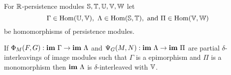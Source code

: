 \begin{theorem}\label{thm:interleaving_main}
  For $\mathbb{R}$-persistence modules $\mathbb{S}, \mathbb{T}, \mathbb{U}, \mathbb{V}, \mathbb{W}$ let
  \[ \Gamma\in\mathrm{Hom}(\mathbb{U},\mathbb{V}),\ \Lambda\in\mathrm{Hom}(\mathbb{S}, \mathbb{T}),\text{ and } \Pi\in\mathrm{Hom}(\mathbb{V},\mathbb{W})\]
  be homomorphisms of persistence modules.%

  If $\Phi_M(F, G) :\mathbf{im}~\Gamma\to\mathbf{im}~\Lambda$ and $\Psi_G(M, N): \mathbf{im}~\Lambda\to\mathbf{im}~\Pi$ are partial $\delta$-interleavings of image modules such that $\Gamma$ is a epimorphism and $\Pi$ is a monomorphism then $\mathbf{im}~\Lambda$ is $\delta$-interleaved with $\mathbb{V}$.
\end{theorem}
